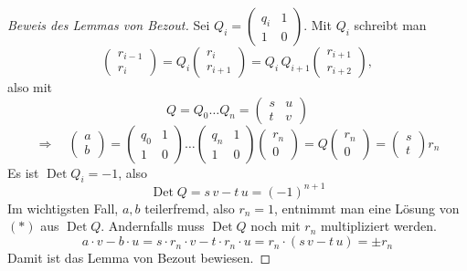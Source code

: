 \begin{proof}[Beweis des Lemmas von Bezout]
Sei $Q_i = \begin{pmatrix} q_i & 1 \\ 1 & 0 \end{pmatrix}$. Mit $Q_i$ schreibt man
\[ \begin{pmatrix} r_{i-1} \\ r_i \end{pmatrix} = Q_i \begin{pmatrix} r_i \\ r_{i+1} \end{pmatrix} = Q_i\, Q_{i+1} \begin{pmatrix} r_{i+1} \\ r_{i+2} \end{pmatrix}, \]
also mit
\[ Q = Q_0 \ldots Q_n = \begin{pmatrix} s & u \\ t & v \end{pmatrix} \]
\[ \Rightarrow \quad \begin{pmatrix} a \\ b \end{pmatrix} = \begin{pmatrix} q_0 & 1 \\ 1 & 0 \end{pmatrix} \ldots \begin{pmatrix} q_n & 1 \\ 1 & 0 \end{pmatrix} \begin{pmatrix} r_n \\ 0 \end{pmatrix} = Q \begin{pmatrix} r_n \\ 0 \end{pmatrix} = \begin{pmatrix} s \\ t \end{pmatrix} r_n \]
Es ist $\operatorname{Det} Q_i = -1$, also
\[ \operatorname{Det} Q = s\,v - t\,u = (-1)^{n+1} \]
Im wichtigsten Fall, $a, b$ teilerfremd, also $r_n = 1$, entnimmt man eine Lösung von $(*)$ aus $\operatorname{Det} Q$. Andernfalls muss $\operatorname{Det} Q$ noch mit $r_n$ multipliziert werden.
\[ a \cdot v - b \cdot u = s \cdot r_n \cdot v - t \cdot r_n \cdot u = r_n \cdot (s\,v - t\,u) = \pm r_n \]
Damit ist das Lemma von Bezout bewiesen.
\end{proof}

